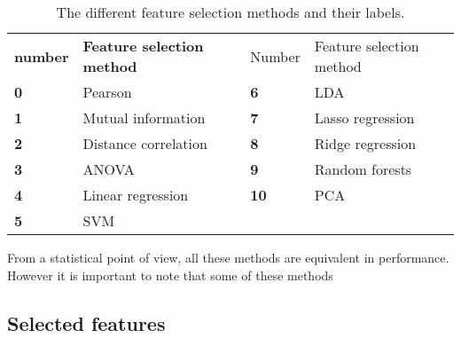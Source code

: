 \begin{table}[H]
\centering
\begin{tabular}{ll|ll}
\textbf{number} & \textbf{Feature selection method} & Number & Feature selection method \\
\textbf{0}      & Pearson                           & \textbf{6}      & LDA                      \\
\textbf{1}      & Mutual information                & \textbf{7}      & Lasso regression         \\
\textbf{2}      & Distance correlation              & \textbf{8}      & Ridge regression         \\
\textbf{3}      & ANOVA                             & \textbf{9}      & Random forests           \\
\textbf{4}      & Linear regression                 & \textbf{10}     & PCA                      \\
\textbf{5}      & SVM                      &        &                         
\end{tabular}
\caption{The different feature selection methods and their labels\label{accCompLbl}.}
\end{table}

From a statistical point of view, all these methods are equivalent in performance. However it is important to note that some of these methods %


\clearpage

\subsection{Selected features}

